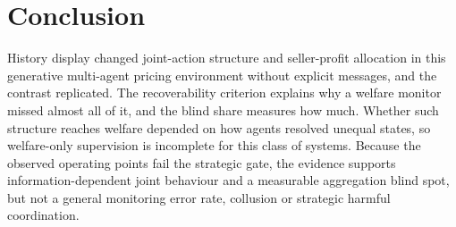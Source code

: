 \documentclass[sigconf,review,anonymous]{acmart}
\begin{document}
\section{Conclusion}

History display changed joint-action structure and seller-profit allocation in this generative multi-agent pricing environment without explicit messages, and the contrast replicated. The recoverability criterion explains why a welfare monitor missed almost all of it, and the blind share measures how much. Whether such structure reaches welfare depended on how agents resolved unequal states, so welfare-only supervision is incomplete for this class of systems. Because the observed operating points fail the strategic gate, the evidence supports information-dependent joint behaviour and a measurable aggregation blind spot, but not a general monitoring error rate, collusion or strategic harmful coordination.

\balance


\end{document}

